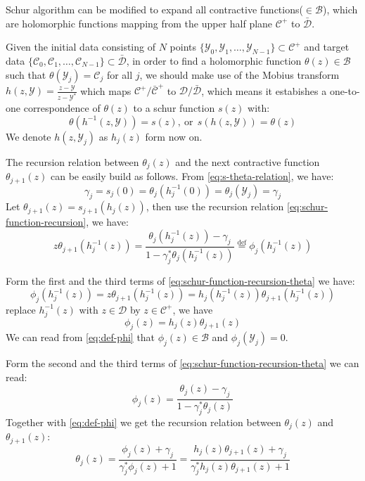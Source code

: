 \documentclass[
	preprint,%
	aps,
	prb,
	showpacs,	
	amsmath, amssymb]{revtex4-2}
\newcommand{\Y}{ {\mathcal{Y}} }
\newcommand{\C}{ {\mathcal{C}} }
\newcommand{\Cbar}{ {\bar{\mathcal{C}}} }
\newcommand{\D}{ {\mathcal{D}} }
\newcommand{\Dbar}{ {\bar{\mathcal{D}}} }
\newcommand{\B}{ {\mathcal{B}} }
\begin{document}
Schur algorithm can be modified to expand all contractive 
functions($\in \B$)\cite{adamyan2003reconstruction}, which are
holomorphic functions mapping from the upper half plane $\C^+$ 
to $\Dbar$.

Given the initial data consisting of $N$ points 
$\{\Y_0, \Y_1, \dots ,\Y_{N-1}\} \subset \C^+$ and target data
$\{\C_0, \C_1, \dots ,\C_{N-1}\} \subset \Dbar$, 
in order to find a holomorphic function $\theta(z) \in \B$ 
such that $\theta(\Y_j) = \C_j$ for all $j$, we should make use 
of the Mobius transform $h(z, \Y)  = \frac{z - \Y}{z - \Y^*}$ 
which maps $\C^+/\Cbar^+$ to $\D/\Dbar$, 
which means it estabishes a one-to-one correspondence of $\theta(z)$ 
to a schur function $s(z)$ with:
\begin{equation}\label{eq:s-theta-relation}
	\theta(h^{-1}(z,\Y)) = s(z),\ \mathrm{or} \ \
	s(h(z,\Y)) = \theta(z)
\end{equation}
We denote $h(z, \Y_j)$ as $h_j(z)$ form now on.

The recursion relation between $\theta_j(z)$ and the next contractive 
function $\theta_{j+1}(z)$ can be easily build as follows. From 
\cref{eq:s-theta-relation}, we have:
\begin{equation}\label{eq:s-theta-relation-z0}
	\gamma_j = s_j(0) = \theta_j(h_j^{-1}(0)) 
		= \theta_j(\Y_j) = \gamma_j
\end{equation}
Let $\theta_{j+1}(z) = s_{j+1}(h_j(z))$,
then use the recursion relation 
\cref{eq:schur-function-recursion}, we have: 
\begin{equation}\label{eq:schur-function-recursion-theta}
	z\theta_{j+1}(h_j^{-1}(z)) 
	= \frac{\theta_j(h_j^{-1}(z)) 
		- \gamma_j}{1 - \gamma_j^* \theta_j(h_j^{-1}(z))}
	\overset{\mathrm{def}}{=} \phi_j(h_j^{-1}(z))
\end{equation}

Form the first and the third terms of \cref{eq:schur-function-recursion-theta}
we have:
\begin{equation}
	\phi_j(h_j^{-1}(z)) = z\theta_{j+1}(h_j^{-1}(z)) 
	=h_j(h_j^{-1}(z)) \theta_{j+1}(h_j^{-1}(z)) 
\end{equation}
replace $h_j^{-1}(z)$ with $z\in\D$ by $z \in \C^+$, we have
\begin{equation}\label{eq:def-phi}
	\phi_j(z) =h_j(z) \theta_{j+1}(z) 
\end{equation}
We can read from \cref{eq:def-phi} that $\phi_j(z) \in \B$ 
and $\phi_j(\Y_j) = 0$.

Form the second and the third terms of \cref{eq:schur-function-recursion-theta}
we can read:
\begin{equation}\label{eq:phi-theta-j}
	\phi_j(z)
	= \frac{\theta_j(z) - \gamma_j}{1 - \gamma_j^* \theta_j(z)}
\end{equation}
Together with \cref{eq:def-phi} we get the recursion relation between 
$\theta_j(z)$ and $\theta_{j+1}(z)$:
\begin{equation}\label{eq:recursion-relation-theta}
	\theta_j(z) = \frac{\phi_j(z) + \gamma_j}{\gamma_j^*\phi_j(z)+1}
		= \frac{h_j(z) \theta_{j+1}(z)  + \gamma_j}
			{\gamma_j^*h_j(z) \theta_{j+1}(z) +1}
\end{equation}
\end{document}
